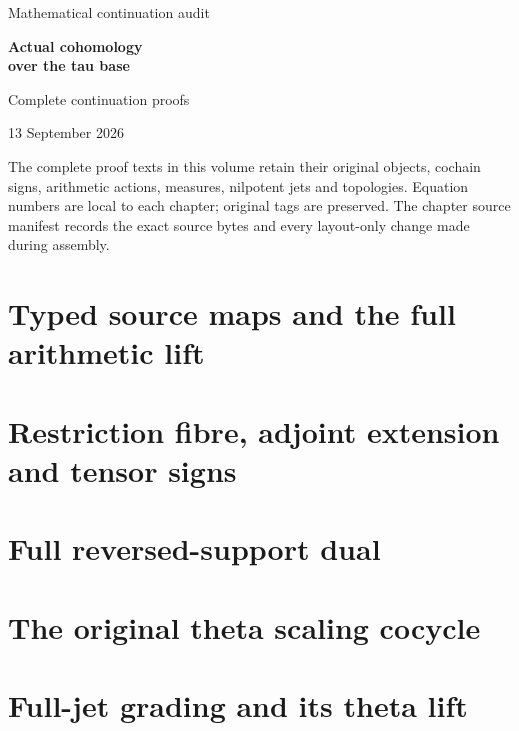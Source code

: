 \documentclass[11pt,a4paper,oneside]{report}
\begin{document}
\begin{titlepage}
\vspace*{22mm}
{\sffamily\Large Mathematical continuation audit\par}
\vspace{12mm}
{\sffamily\bfseries\huge Actual cohomology\\[3mm]over the tau base\par}
\vspace{12mm}
{\Large Complete continuation proofs\par}
\vspace{8mm}
{\large 13 September 2026\par}
\vfill
The complete proof texts in this volume retain their original objects,
cochain signs, arithmetic actions, measures, nilpotent jets and topologies.
Equation numbers are local to each chapter; original tags are preserved.
The chapter source manifest records the exact source bytes and every
layout-only change made during assembly.
\end{titlepage}
\tableofcontents
\clearpage

\chapter{Typed source maps and the full arithmetic lift}
\begingroup

\endgroup
\clearpage
\chapter{Restriction fibre, adjoint extension and tensor signs}
\begingroup

\endgroup
\clearpage
\chapter{Full reversed-support dual}
\begingroup

\endgroup
\clearpage
\chapter{The original theta scaling cocycle}
\begingroup

\endgroup
\clearpage
\chapter{Full-jet grading and its theta lift}
\begingroup

\endgroup
\clearpage
\end{document}
